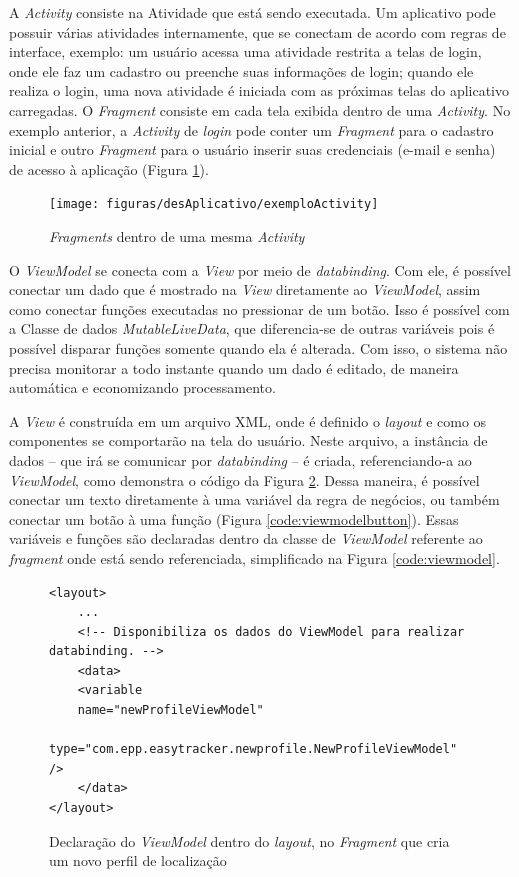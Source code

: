 A \textit{Activity} consiste na Atividade que está sendo executada. Um aplicativo pode possuir várias atividades internamente, que se conectam de acordo com regras de interface, exemplo: um usuário acessa uma atividade restrita a telas de login, onde ele faz um cadastro ou preenche suas informações de login; quando ele realiza o login, uma nova atividade é iniciada com as próximas telas do aplicativo carregadas. O \textit{Fragment} consiste em cada tela exibida dentro de uma \textit{Activity}. No exemplo anterior, a \textit{Activity} de \textit{login} pode conter um \textit{Fragment} para o cadastro inicial e outro \textit{Fragment} para o usuário inserir suas credenciais (e-mail e senha) de acesso à aplicação (Figura \ref{fig:exemploActivity}). 


\begin{figure}[!htb]
	\centering
	\caption{\textit{Fragments} dentro de uma mesma \textit{Activity}}
	\texttt{[image: figuras/desAplicativo/exemploActivity]}
	\label{fig:exemploActivity}
\end{figure}

O \textit{ViewModel} se conecta com a \textit{View} por meio de \textit{databinding}. Com ele, é possível conectar um dado que é mostrado na \textit{View} diretamente ao \textit{ViewModel}, assim como conectar funções executadas no pressionar de um botão. Isso é possível com a Classe de dados \textit{MutableLiveData}, que diferencia-se de outras variáveis pois é possível disparar funções somente quando ela é alterada. Com isso, o sistema não precisa monitorar a todo instante quando um dado é editado, de maneira automática e economizando processamento. 

A \textit{View} é construída em um arquivo XML, onde é definido o \textit{layout} e como os componentes se comportarão na tela do usuário. Neste arquivo, a instância de dados -- que irá se comunicar por \textit{databinding} -- é criada, referenciando-a ao \textit{ViewModel}, como demonstra o código da Figura \ref{code:layoutdata}.
 Dessa maneira, é possível conectar um texto diretamente à uma variável da regra de negócios, ou também conectar um botão à uma função (Figura \ref{code:viewmodelbutton}). Essas variáveis e funções são declaradas dentro da classe de \textit{ViewModel} referente ao \textit{fragment} onde está sendo referenciada, simplificado na Figura \ref{code:viewmodel}.

\begin{figure}[!htb]
	\centering
	\caption{Declaração do \textit{ViewModel} dentro do \textit{layout}, no \textit{Fragment} que cria um novo perfil de localização}
	\vspace{-15pt}
	\begin{verbatim}
<layout>
	...
	<!-- Disponibiliza os dados do ViewModel para realizar databinding. -->
	<data>
	<variable
	name="newProfileViewModel"
	type="com.epp.easytracker.newprofile.NewProfileViewModel" />
	</data>		
</layout>
	\end{verbatim}
	\label{code:layoutdata}
	\vspace{-30pt}
\end{figure}

